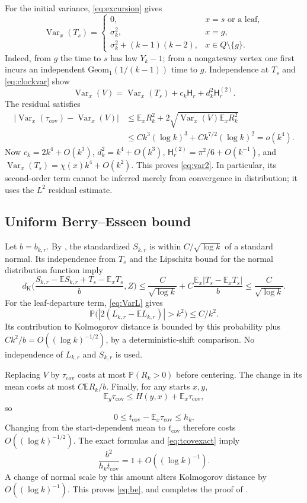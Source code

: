 \documentclass[11pt]{amsart}
\theoremstyle{remark}
\numberwithin{equation}{section}
\DeclareMathOperator{\Var}{Var}
\newcommand{\E}{\mathbb{E}}
\newcommand{\Prob}{\mathbb{P}}
\newcommand{\tcov}{t_{\mathrm{cov}}}
\newcommand{\taucov}{\tau_{\mathrm{cov}}}
\newcommand{\dK}{d_{\mathrm{K}}}
\newcommand{\Harm}{\mathsf{H}}
\newcommand{\Geom}{\mathrm{Geom}}
\begin{document}
For the initial variance, \eqref{eq:excursion} gives
\begin{equation}\label{eq:VarTs}
\Var_x(T_s)=
\begin{cases}
0, & x=s\text{ or a leaf},\\
\sigma_k^2, & x=g,\\
\sigma_k^2+(k-1)(k-2), & x\in Q\setminus\{g\}.
\end{cases}
\end{equation}
Indeed, from $g$ the time to $s$ has law $Y_k-1$; from a nongateway vertex one first incurs an independent $\Geom_1(1/(k-1))$ time to $g$. Independence at $T_s$ and \eqref{eq:clockvar} show
\[
\Var_x(V)=\Var_x(T_s)+c_k\Harm_r+d_k^2\Harm^{(2)}_r.
\]
The residual satisfies
\begin{align*}
|\Var_x(\taucov)-\Var_x(V)|&\le\E_xR_k^2+2\sqrt{\Var_x(V)\E_xR_k^2}\\
&\le Ck^3(\log k)^3+Ck^{7/2}(\log k)^2=o(k^4).
\end{align*}
Now $c_k=2k^4+O(k^3)$, $d_k^2=k^4+O(k^3)$, $\Harm^{(2)}_r=\pi^2/6+O(k^{-1})$, and $\Var_x(T_s)=\chi(x)k^4+O(k^2)$. This proves \eqref{eq:var2}. In particular, its second-order term cannot be inferred merely from convergence in distribution; it uses the $L^2$ residual estimate.

\subsection{Uniform Berry--Esseen bound}
Let $b=b_{k,r}$. By , the standardized $S_{k,r}$ is within $C/\sqrt{\log k}$ of a standard normal. Its independence from $T_s$ and the Lipschitz bound for the normal distribution function imply
\[
\dK\Big(\frac{S_{k,r}-\E S_{k,r}+T_s-\E_xT_s}{b},Z\Big)\le\frac{C}{\sqrt{\log k}}+C\frac{\E_x|T_s-\E_xT_s|}{b}\le\frac{C}{\sqrt{\log k}}.
\]
For the leaf-departure term, \eqref{eq:VarL} gives
\[
\Prob\big(|2(L_{k,r}-\E L_{k,r})|>k^2\big)\le C/k^2.
\]
Its contribution to Kolmogorov distance is bounded by this probability plus $Ck^2/b=O((\log k)^{-1/2})$, by a deterministic-shift comparison. No independence of $L_{k,r}$ and $S_{k,r}$ is used.

Replacing $V$ by $\taucov$ costs at most $\Prob(R_k>0)$ before centering. The change in its mean costs at most $C\E R_k/b$. Finally, for any starts $x,y$,
\[
\E_y\taucov\le H(y,x)+\E_x\taucov,
\]
so
\begin{equation}\label{eq:tcovgap}
0\le\tcov-\E_x\taucov\le h_k.
\end{equation}
Changing from the start-dependent mean to $\tcov$ therefore costs $O((\log k)^{-1/2})$. The exact formulas and \eqref{eq:tcovexact} imply
\[
\frac{b^2}{h_k\tcov}=1+O((\log k)^{-1}).
\]
A change of normal scale by this amount alters Kolmogorov distance by $O((\log k)^{-1})$. This proves \eqref{eq:be}, and completes the proof of .
\end{document}
